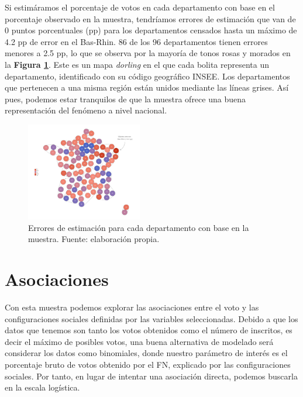 Si estimáramos el porcentaje de votos en cada departamento con base en el porcentaje observado en la muestra, tendríamos errores de estimación que van de 0 puntos porcentuales (pp) para los departamentos censados hasta un máximo de 4.2 pp de error en el Bas-Rhin. 86 de los 96 departamentos tienen errores menores a 2.5 pp, lo que se observa por la mayoría de tonos rosas y morados en la \textbf{Figura \ref{fig:Errores_Est_Muestra}}. Este es un mapa \textit{dorling} en el que cada bolita representa un departamento, identificado con su código geográfico INSEE. Los departamentos que pertenecen a una misma región están unidos mediante las líneas grises. Así pues, podemos estar tranquilos de que la muestra ofrece una buena representación del fenómeno a nivel nacional.\\ 

\begin{figure}[h]
	\centering
	\includegraphics[width = 0.45\textwidth]{Figs/AED/Dorling_Errores_P12_FN_MUESTRA}
	\caption{Errores de estimación para cada departamento con base en la muestra. Fuente: elaboración propia.}
	\label{fig:Errores_Est_Muestra}	
\end{figure}

\section{Asociaciones}

Con esta muestra podemos explorar las asociaciones entre el voto y las configuraciones sociales definidas por las variables seleccionadas. Debido a que los datos que tenemos son tanto los votos obtenidos como el número de inscritos, es decir el máximo de posibles votos, una buena alternativa de modelado será considerar los datos como binomiales, donde nuestro parámetro de interés es el porcentaje bruto de votos obtenido por el FN, explicado por las configuraciones sociales. Por tanto, en lugar de intentar una asociación directa, podemos buscarla en la escala logística.\\

